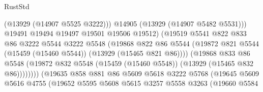 \begin{lexlean}{RustStd}
\begin{coremodule}
                                          (@13929 (@14907 @5525 @3222)))
                                        @14905
                                        (@13929 (@14907 @5482 @5531)))
                                      @19491
                                      @19494
                                      @19497
                                      @19501
                                      @19506
                                      @19512)
                                    (@19519
                                      @5541
                                      @822
                                      @833
                                      @86
                                      @3222
                                      @5544
                                      @3222
                                      @5548
                                      (@19868
                                        @822
                                        @86
                                        @5544
                                        (@19872
                                          @821
                                          @5544
                                          (@15459 (@15460 @5544))
                                          (@13929 (@15465 @821 @86))))
                                      (@19868
                                        @833
                                        @86
                                        @5548
                                        (@19872
                                          @832
                                          @5548
                                          (@15459 (@15460 @5548))
                                          (@13929 (@15465 @832 @86))))))))
                              (@19635
                                @858
                                @881
                                @86
                                @5609
                                @5618
                                @3222
                                @5768
                                (@19645
                                  @5609
                                  @5616
                                  @4755
                                  (@19652
                                    @5595
                                    @5608
                                    @5615
                                    @3257
                                    @5558
                                    @3263
                                    (@19660
                                      @5584

\end{coremodule}
\end{lexlean}
